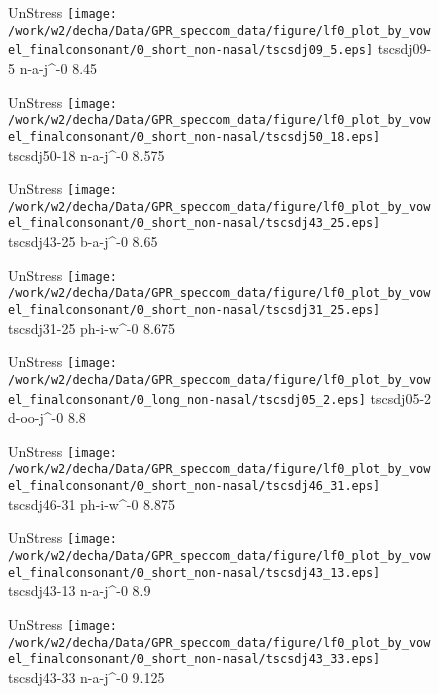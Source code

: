 \documentclass{article}
\begin{document}
\begin{figure}[t]
\begin{minipage}[b]{.24\textwidth}
UnStress
\centering
\texttt{[image: /work/w2/decha/Data/GPR\_speccom\_data/figure/lf0\_plot\_by\_vowel\_finalconsonant/0\_short\_non-nasal/tscsdj09\_5.eps]}
tscsdj09-5 n-a-j\textasciicircum-0 8.45
\end{minipage}
\begin{minipage}[b]{.24\textwidth}
UnStress
\centering
\texttt{[image: /work/w2/decha/Data/GPR\_speccom\_data/figure/lf0\_plot\_by\_vowel\_finalconsonant/0\_short\_non-nasal/tscsdj50\_18.eps]}
tscsdj50-18 n-a-j\textasciicircum-0 8.575
\end{minipage}
\begin{minipage}[b]{.24\textwidth}
UnStress
\centering
\texttt{[image: /work/w2/decha/Data/GPR\_speccom\_data/figure/lf0\_plot\_by\_vowel\_finalconsonant/0\_short\_non-nasal/tscsdj43\_25.eps]}
tscsdj43-25 b-a-j\textasciicircum-0 8.65
\end{minipage}
\begin{minipage}[b]{.24\textwidth}
UnStress
\centering
\texttt{[image: /work/w2/decha/Data/GPR\_speccom\_data/figure/lf0\_plot\_by\_vowel\_finalconsonant/0\_short\_non-nasal/tscsdj31\_25.eps]}
tscsdj31-25 ph-i-w\textasciicircum-0 8.675
\end{minipage}
\end{figure}

\begin{figure}[t]
\begin{minipage}[b]{.24\textwidth}
UnStress
\centering
\texttt{[image: /work/w2/decha/Data/GPR\_speccom\_data/figure/lf0\_plot\_by\_vowel\_finalconsonant/0\_long\_non-nasal/tscsdj05\_2.eps]}
tscsdj05-2 d-oo-j\textasciicircum-0 8.8
\end{minipage}
\begin{minipage}[b]{.24\textwidth}
UnStress
\centering
\texttt{[image: /work/w2/decha/Data/GPR\_speccom\_data/figure/lf0\_plot\_by\_vowel\_finalconsonant/0\_short\_non-nasal/tscsdj46\_31.eps]}
tscsdj46-31 ph-i-w\textasciicircum-0 8.875
\end{minipage}
\begin{minipage}[b]{.24\textwidth}
UnStress
\centering
\texttt{[image: /work/w2/decha/Data/GPR\_speccom\_data/figure/lf0\_plot\_by\_vowel\_finalconsonant/0\_short\_non-nasal/tscsdj43\_13.eps]}
tscsdj43-13 n-a-j\textasciicircum-0 8.9
\end{minipage}
\begin{minipage}[b]{.24\textwidth}
UnStress
\centering
\texttt{[image: /work/w2/decha/Data/GPR\_speccom\_data/figure/lf0\_plot\_by\_vowel\_finalconsonant/0\_short\_non-nasal/tscsdj43\_33.eps]}
tscsdj43-33 n-a-j\textasciicircum-0 9.125
\end{minipage}
\end{figure}
\end{document}
